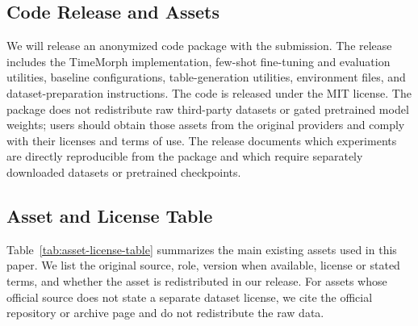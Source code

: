 \documentclass[10pt,journal,compsoc]{IEEEtran}
\begin{document}
\subsection{Code Release and Assets}
\label{app:code-and-assets}

We will release an anonymized code package with the submission. The release includes the TimeMorph implementation, few-shot fine-tuning and evaluation utilities, baseline configurations, table-generation utilities, environment files, and dataset-preparation instructions. The code is released under the MIT license. The package does not redistribute raw third-party datasets or gated pretrained model weights; users should obtain those assets from the original providers and comply with their licenses and terms of use. The release documents which experiments are directly reproducible from the package and which require separately downloaded datasets or pretrained checkpoints.

\subsection{Asset and License Table}
\label{app:asset-license-table}

Table~\ref{tab:asset-license-table} summarizes the main existing assets used in this paper. We list the original source, role, version when available, license or stated terms, and whether the asset is redistributed in our release. For assets whose official source does not state a separate dataset license, we cite the official repository or archive page and do not redistribute the raw data.
\end{document}
